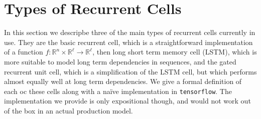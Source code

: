 \documentclass[10pt]{amsart}
\newcommand{\R}{\mathbb{R}}
\theoremstyle{definition}
\begin{document}




\section{Types of Recurrent Cells}


In this section we descripbe three of the main types of recurrent cells currently in use.  They are the basic recurrent cell, which is a straightforward implementation of a function $f:\R^n\times\R^\ell\to\R^\ell$, then long short term memory cell (LSTM), which is more suitable to model long term dependencies in sequences, and the gated recurrent unit cell, which is a simplification of the LSTM cell, but which performs almost equally well at long term dependencies. We give a formal definition of each oc these cells along with a na\"ive implementation in {\tt tensorflow}. The implementation we provide is only expositional though, and would not work out of the box in an actual production model.
\end{document}
